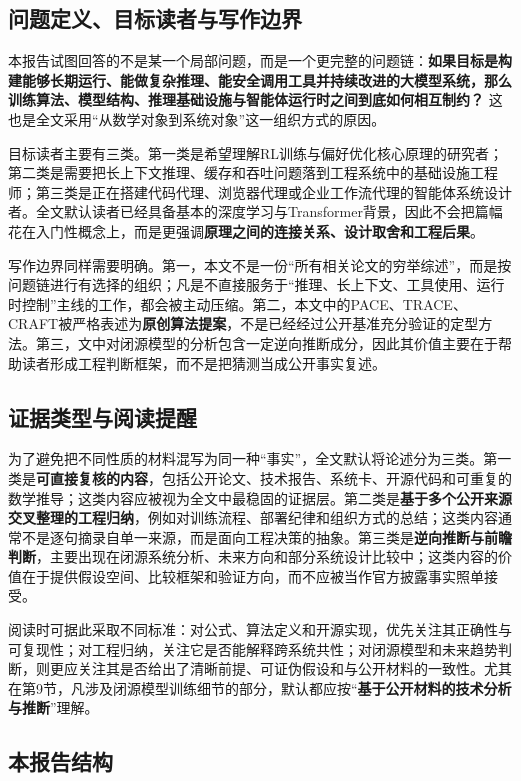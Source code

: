 \documentclass[12pt,a4paper]{article}
\begin{document}
\subsection{问题定义、目标读者与写作边界}

本报告试图回答的不是某一个局部问题，而是一个更完整的问题链：\textbf{如果目标是构建能够长期运行、能做复杂推理、能安全调用工具并持续改进的大模型系统，那么训练算法、模型结构、推理基础设施与智能体运行时之间到底如何相互制约？} 这也是全文采用“从数学对象到系统对象”这一组织方式的原因。

目标读者主要有三类。第一类是希望理解RL训练与偏好优化核心原理的研究者；第二类是需要把长上下文推理、缓存和吞吐问题落到工程系统中的基础设施工程师；第三类是正在搭建代码代理、浏览器代理或企业工作流代理的智能体系统设计者。全文默认读者已经具备基本的深度学习与Transformer背景，因此不会把篇幅花在入门性概念上，而是更强调\textbf{原理之间的连接关系、设计取舍和工程后果}。

写作边界同样需要明确。第一，本文不是一份“所有相关论文的穷举综述”，而是按问题链进行有选择的组织；凡是不直接服务于“推理、长上下文、工具使用、运行时控制”主线的工作，都会被主动压缩。第二，本文中的PACE、TRACE、CRAFT被严格表述为\textbf{原创算法提案}，不是已经经过公开基准充分验证的定型方法。第三，文中对闭源模型的分析包含一定逆向推断成分，因此其价值主要在于帮助读者形成工程判断框架，而不是把猜测当成公开事实复述。

\subsection{证据类型与阅读提醒}

为了避免把不同性质的材料混写为同一种“事实”，全文默认将论述分为三类。第一类是\textbf{可直接复核的内容}，包括公开论文、技术报告、系统卡、开源代码和可重复的数学推导；这类内容应被视为全文中最稳固的证据层。第二类是\textbf{基于多个公开来源交叉整理的工程归纳}，例如对训练流程、部署纪律和组织方式的总结；这类内容通常不是逐句摘录自单一来源，而是面向工程决策的抽象。第三类是\textbf{逆向推断与前瞻判断}，主要出现在闭源系统分析、未来方向和部分系统设计比较中；这类内容的价值在于提供假设空间、比较框架和验证方向，而不应被当作官方披露事实照单接受。

阅读时可据此采取不同标准：对公式、算法定义和开源实现，优先关注其正确性与可复现性；对工程归纳，关注它是否能解释跨系统共性；对闭源模型和未来趋势判断，则更应关注其是否给出了清晰前提、可证伪假设和与公开材料的一致性。尤其在第9节，凡涉及闭源模型训练细节的部分，默认都应按“\textbf{基于公开材料的技术分析与推断}”理解。

\subsection{本报告结构}
\end{document}
